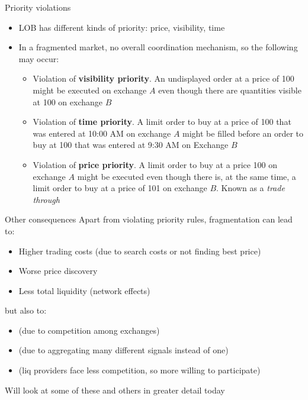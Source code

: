 \documentclass[english,10pt
,aspectratio=169
]{beamer}
\begin{document}
\begin{frame}{Priority violations}
	\begin{itemize}
		\item  LOB has different kinds of priority: price, visibility,  time
		\item In a fragmented market, no overall coordination mechanism, so the following may occur:
		\begin{itemize}
			\item Violation of \textbf{visibility priority}. An undisplayed order at a price of 100 might be executed on exchange $A$ even though there are quantities visible at 100 on exchange $B$
			\item Violation of \textbf{time priority}. A limit order to buy at a price of 100 that was entered at 10:00 AM on exchange $A$ might be filled before an order to buy at 100 that was entered at 9:30 AM on Exchange $B$
			\item Violation of \textbf{price priority}. A limit order to buy at a price 100 on exchange $A$ might be executed even though there is, at the same time, a limit order to buy at a price of 101 on exchange $B$. Known as a \textit{trade through}
		\end{itemize}
	\end{itemize}
\end{frame}


\begin{frame}{Other consequences}
	Apart from violating priority rules, fragmentation can lead to:
	\begin{itemize}
		\item \alert{Higher trading costs} (due to search costs or not finding best price)
		\item \alert{Worse price discovery}
		\item \alert{Less total liquidity} (network effects)
	\end{itemize}
	\pause
	but also to:
	\begin{itemize}
		\item {} (due to competition among exchanges)
		\item {} (due to aggregating many different signals instead of one)
		\item {} (liq providers face less competition, so more willing to participate)
	\end{itemize}
	Will look at some of these and others in greater detail today
\end{frame}
\end{document}
